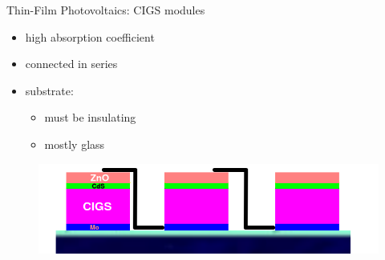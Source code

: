 \documentclass[hyperref={pdfpagelabels=false}, aspectratio=43, t]{beamer}  %
\begin{document}

	\begin{frame}{Thin-Film Photovoltaics: CIGS modules}
	\begin{itemize}
		\item high absorption coefficient
		\item connected in series 
		\item substrate:
			\begin{itemize}
				\item must be insulating 
				\item mostly glass
			\end{itemize}
	\end{itemize}
	\begin{figure}
		\includegraphics[width=.9\textwidth]{figures/cigs_mod.png}
	\end{figure}
\end{frame}
\end{document}
